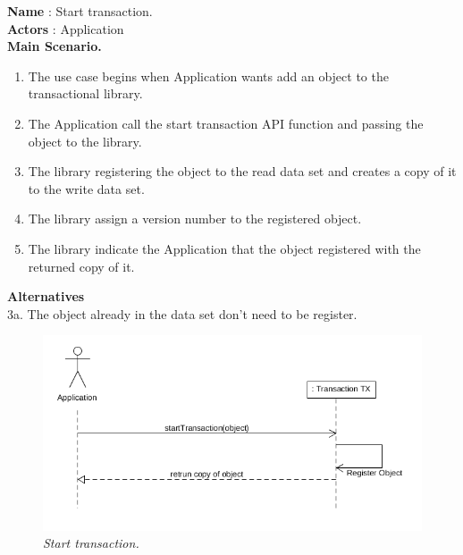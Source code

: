 \documentclass[12pt]{article}
\begin{document}
{\textbf{Name} : Start transaction.\\
\textbf{Actors} : Application\\
\textbf{Main Scenario.}
\begin{enumerate}
  \item The use case begins when Application wants add an object to the transactional library.
  \item The Application call the start transaction API function and passing the object to the library.
  \item The library registering the object to the read data set and creates  a copy of it to the write data set.
  \item The library assign a version number to the registered object.
  \item The library indicate the Application that the object registered with the returned copy of it.
\end{enumerate}
\textbf{Alternatives}\\
3a. The object already in the data set don't need to be register.\\

\begin{figure}[h!]
\centering
\includegraphics[scale=0.5]{Pictures/start.png}
\caption{\textit{\color{gray}Start transaction.}}
\end{figure}

}
\end{document}
